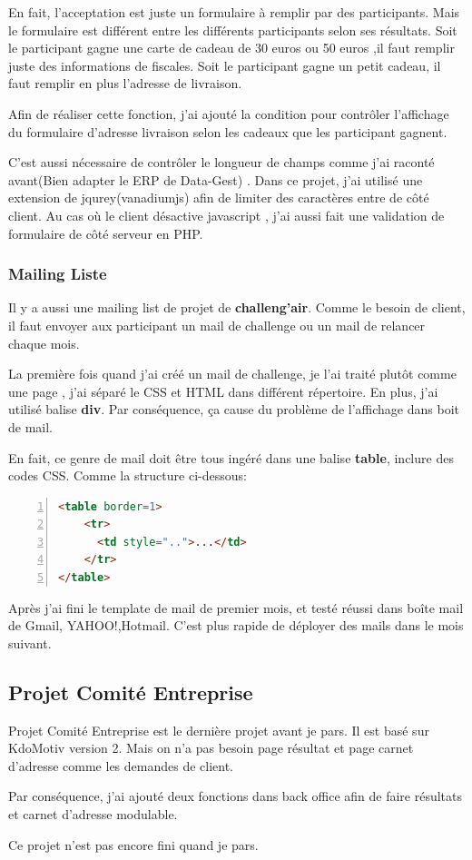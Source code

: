 En fait, l'acceptation est juste un formulaire à remplir par des participants.  Mais le formulaire est différent entre les différents participants selon ses résultats. Soit le participant gagne une carte de cadeau de 30 euros ou 50 euros ,il faut remplir juste des informations de fiscales. Soit le participant gagne un petit cadeau, il faut remplir en plus l'adresse de livraison. 

Afin de réaliser cette fonction, j'ai ajouté la condition pour contrôler l'affichage du formulaire d'adresse livraison  selon les cadeaux que les participant gagnent. 

C'est aussi nécessaire de contrôler le longueur de champs comme j'ai raconté avant(Bien adapter le ERP de Data-Gest) . Dans ce projet, j'ai utilisé une extension de jqurey(vanadiumjs) afin de limiter des caractères entre de côté client. Au cas où le client désactive javascript , j'ai aussi fait une validation de formulaire de côté serveur en PHP.

\subsubsection{Mailing Liste}
Il y a aussi une mailing list de projet de \textbf{challeng'air}. Comme le besoin de client, il faut envoyer aux participant un  mail de challenge ou un mail de relancer chaque mois. 

La première fois quand j'ai créé un mail de challenge, je l'ai traité plutôt comme une page , j'ai séparé le CSS et  HTML dans différent répertoire. En plus, j'ai utilisé balise \textbf{div}. Par conséquence, ça cause du problème de l'affichage dans boit de mail.

En fait, ce genre de mail doit être tous ingéré dans une balise \textbf{table}, inclure des codes CSS. Comme la structure ci-dessous:
\begin{lstlisting}[language= html, numbers=left, numberstyle=\tiny,  frame=shadowbox]
<table border=1>
	<tr>
      <td style="..">...</td>
    </tr> 
</table>
\end{lstlisting}

Après j'ai fini le template de mail de premier mois, et testé réussi dans boîte mail de Gmail, YAHOO!,Hotmail. C'est plus rapide de déployer des mails dans le  mois suivant. 
   
\subsection{Projet Comité Entreprise}
Projet Comité Entreprise est le dernière projet avant je pars. Il est basé sur KdoMotiv version 2. Mais on n'a pas besoin page résultat et page carnet d'adresse comme les demandes de client.  

Par conséquence, j'ai ajouté deux fonctions dans back office afin de faire résultats et carnet d'adresse modulable. 

Ce projet n'est pas encore fini quand je pars.




